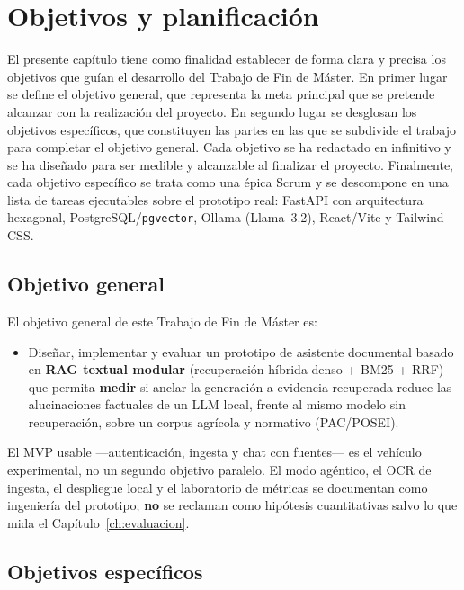\chapter{Objetivos y planificación}
\label{ch:objetivos}

El presente capítulo tiene como finalidad establecer de forma clara y precisa los objetivos que guían el desarrollo del Trabajo de Fin de Máster. En primer lugar se define el objetivo general, que representa la meta principal que se pretende alcanzar con la realización del proyecto. En segundo lugar se desglosan los objetivos específicos, que constituyen las partes en las que se subdivide el trabajo para completar el objetivo general. Cada objetivo se ha redactado en infinitivo y se ha diseñado para ser medible y alcanzable al finalizar el proyecto. Finalmente, cada objetivo específico se trata como una épica Scrum y se descompone en una lista de tareas ejecutables sobre el prototipo real: FastAPI con arquitectura hexagonal, PostgreSQL/\texttt{pgvector}, Ollama (Llama~3.2), React/Vite y Tailwind CSS.

\section{Objetivo general}

El objetivo general de este Trabajo de Fin de Máster es:

\begin{itemize}
  \item Diseñar, implementar y evaluar un prototipo de asistente documental basado en \textbf{RAG textual modular} (recuperación híbrida denso + BM25 + RRF) que permita \textbf{medir} si anclar la generación a evidencia recuperada reduce las alucinaciones factuales de un LLM local, frente al mismo modelo sin recuperación, sobre un corpus agrícola y normativo (PAC/POSEI).
\end{itemize}

El MVP usable ---autenticación, ingesta y chat con fuentes--- es el vehículo experimental, no un segundo objetivo paralelo. El modo agéntico, el OCR de ingesta, el despliegue local y el laboratorio de métricas se documentan como ingeniería del prototipo; \textbf{no} se reclaman como hipótesis cuantitativas salvo lo que mida el Capítulo~\ref{ch:evaluacion}.

\section{Objetivos específicos}

